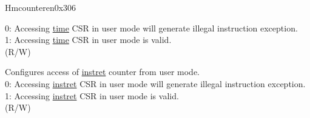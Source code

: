 \begin{register}{H}{mcounteren}{0x306}
\begin{regdesc}
\begin{reglist}
0: Accessing \hyperref[regdesc:TIME]{time} CSR in user mode will generate illegal instruction exception. \\
1: Accessing \hyperref[regdesc:TIME]{time} CSR in user mode is valid. \\
(R/W)  \\
\label{fielddesc:MCOUNTEREN_IR}\item [IR] Configures access of \hyperref[regdesc:INSTRET]{instret} counter from user mode. \\
0: Accessing \hyperref[regdesc:INSTRET]{instret} CSR in user mode will generate illegal instruction exception. \\
1: Accessing \hyperref[regdesc:INSTRET]{instret} CSR in user mode is valid. \\
(R/W) 
\end{reglist}\end{regdesc}
\end{register}

